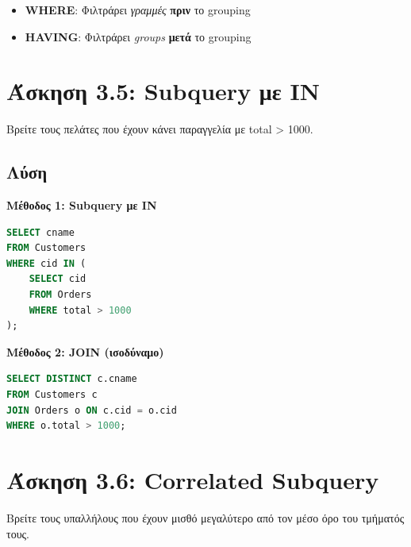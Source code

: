 \begin{infobox}
\begin{itemize}
    \item \textbf{WHERE}: Φιλτράρει \textit{γραμμές} \textbf{πριν} το grouping
    \item \textbf{HAVING}: Φιλτράρει \textit{groups} \textbf{μετά} το grouping
\end{itemize}
\end{infobox}

\section{Άσκηση 3.5: Subquery με IN}

\begin{formulabox}[Εκφώνηση]
Βρείτε τους πελάτες που έχουν κάνει παραγγελία με total > 1000.
\end{formulabox}

\subsection*{Λύση}

\textbf{Μέθοδος 1: Subquery με IN}

\begin{lstlisting}[language=SQL]
SELECT cname
FROM Customers
WHERE cid IN (
    SELECT cid
    FROM Orders
    WHERE total > 1000
);
\end{lstlisting}

\textbf{Μέθοδος 2: JOIN (ισοδύναμο)}

\begin{lstlisting}[language=SQL]
SELECT DISTINCT c.cname
FROM Customers c
JOIN Orders o ON c.cid = o.cid
WHERE o.total > 1000;
\end{lstlisting}

\section{Άσκηση 3.6: Correlated Subquery}

\begin{formulabox}[Εκφώνηση]
Βρείτε τους υπαλλήλους που έχουν μισθό μεγαλύτερο από τον μέσο όρο του τμήματός τους.
\end{formulabox}

